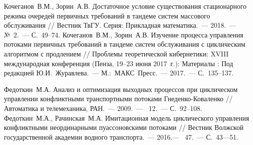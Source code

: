 \documentclass[11pt]{ubs}
\begin{document}
\begin{thebibliography}{100}
 Кочеганов~В.М., Зорин~А.В. Достаточное условие существования стационарного режима очередей первичных требований в тандеме систем массового обслуживания // Вестник ТвГУ. Серия: Прикладная математика.~--- 2018.~--- №~2.~--- С.~49--74.
 Кочеганов~В.М., Зорин~А.В. Изучение процесса управления потоками первичных требований в тандеме систем обслуживания с циклическим алгоритмом с продлением // Проблемы теоретической кибернетики: XVIII международная конференция (Пенза, 19--23 июня 2017~г.): Материалы : Под редакцией Ю.И.~Журавлева.~--- М.:~МАКС~Пресс.~--- 2017.~--- С.~135--137.

 Федоткин~М.А. Анализ и оптимизация выходных процессов при циклическом управлении конфликтными транспортными потоками Гнеденко-Коваленко  // Автоматика и телемеханика, РАН.~--- 2009.~--- \No{}~12.~--- С.~92--108.
 Федоткин~М.А., Рачинская~М.А. Имитационная модель циклического управления конфликтными неординарными пуассоновскими потоками // Вестник Волжской государственной академии водного транспорта.~--- 2016.--- \No{}~47.~--- С.~43---51.



\end{thebibliography}
\end{document}
